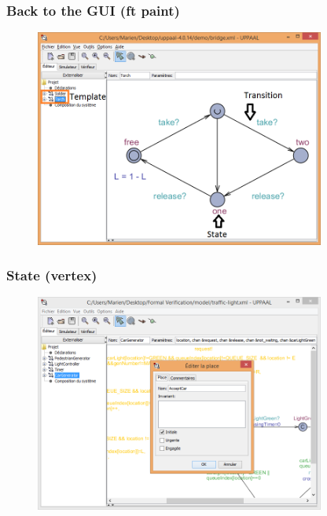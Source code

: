 \documentclass{bredelebeamer}
\begin{document}
\begin{frame}
	\frametitle{Back to the GUI (ft paint)}
	\begin{figure}
    	\centering
    	\includegraphics[width = 0.85\textwidth]{uppaal_eta.png}
  	\end{figure}
\end{frame}

\begin{frame}
	\frametitle{State (vertex)}
	\begin{figure}
    	\centering
    	\includegraphics[width = 0.85\textwidth]{uppaal_vertex_editor.png}
  	\end{figure}
\end{frame}
\end{document}
